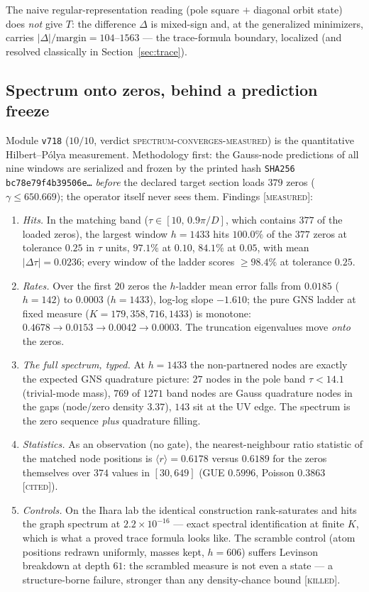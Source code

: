 \documentclass[11pt,a4paper]{article}
\theoremstyle{remark}
\newcommand{\MEASURED}{\textnormal{[\textsc{measured}]}}
\newcommand{\KILLED}{\textnormal{[\textsc{killed}]}}
\newcommand{\CITED}{\textnormal{[\textsc{cited}]}}
\begin{document}
The naive regular-representation reading (pole square $+$ diagonal
orbit state) does \emph{not} give $T$: the difference $\Delta$ is
mixed-sign and, at the generalized minimizers, carries
$|\Delta|/\text{margin}=104$--$1563$ --- the trace-formula boundary,
localized (and resolved classically in Section~\ref{sec:trace}).

\subsection{Spectrum onto zeros, behind a prediction
freeze}\label{sec:spectrum}

Module \texttt{v718} ($10/10$, verdict
\textsc{spectrum-converges-measured}) is the quantitative
Hilbert--P\'olya measurement.  Methodology first: the Gauss-node
predictions of all nine windows are serialized and frozen by the
printed hash \texttt{SHA256 bc78e79f4b39506e\ldots} \emph{before}
the declared target section loads $379$ zeros
($\gamma\le650.669$); the operator itself never sees them.  Findings
\MEASURED:
\begin{enumerate}
\item[(i)] \emph{Hits.}  In the matching band ($\tau\in[10,\,
0.9\pi/D]$, which contains $377$ of the loaded zeros), the largest
window $h=1433$ hits $100.0\%$ of the $377$ zeros at tolerance
$0.25$ in $\tau$ units, $97.1\%$ at $0.10$, $84.1\%$ at $0.05$,
with mean $|\Delta\tau|=0.0236$; every window of the ladder scores
$\ge98.4\%$ at tolerance $0.25$.
\item[(ii)] \emph{Rates.}  Over the first $20$ zeros the $h$-ladder
mean error falls from $0.0185$ ($h=142$) to $0.0003$ ($h=1433$),
log-log slope $-1.610$; the pure GNS ladder at fixed measure
($K=179,358,716,1433$) is monotone:
$0.4678\to0.0153\to0.0042\to0.0003$.  The truncation eigenvalues
move \emph{onto} the zeros.
\item[(iii)] \emph{The full spectrum, typed.}  At $h=1433$ the
non-partnered nodes are exactly the expected GNS quadrature picture:
$27$ nodes in the pole band $\tau<14.1$ (trivial-mode mass),
$769$ of $1271$ band nodes are Gauss quadrature nodes in the gaps
(node/zero density $3.37$), $143$ sit at the UV edge.  The spectrum
is the zero sequence \emph{plus} quadrature filling.
\item[(iv)] \emph{Statistics.}  As an observation (no gate), the
nearest-neighbour ratio statistic of the matched node positions is
$\langle r\rangle=0.6178$ versus $0.6189$ for the zeros themselves
over $374$ values in $[30,649]$ (GUE $0.5996$, Poisson $0.3863$
\CITED).
\item[(v)] \emph{Controls.}  On the Ihara lab the identical
construction rank-saturates and hits the graph spectrum at
$2.2\times10^{-16}$ --- exact spectral identification at finite $K$,
which is what a proved trace formula looks like.  The scramble
control (atom positions redrawn uniformly, masses kept, $h=606$)
suffers Levinson breakdown at depth $61$: the scrambled measure is
not even a state --- a structure-borne failure, stronger than any
density-chance bound \KILLED.
\end{enumerate}
\end{document}
